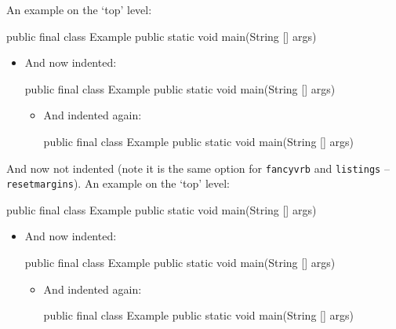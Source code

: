 \documentclass[polish]{article}
\begin{document}
\noindent%
An example on the `top' level:

\begin{javablock}
public final class Example {
	public static void main(String [] args) {
	}
}
\end{javablock}

\begin{itemize}
	\item And now indented:
\begin{javablock}
public final class Example {
	public static void main(String [] args) {
	}
}
\end{javablock}

	\begin{itemize}
		\item And indented again:
\begin{javablock}
public final class Example {
	public static void main(String [] args) {
	}
}
\end{javablock}
	\end{itemize}
\end{itemize}

\bigskip\noindent%
And now not indented (note it is the same option for \texttt{fancyvrb} and \texttt{listings} -- \texttt{resetmargins}).
An example on the `top' level:

\begin{ljavablock}
public final class Example {
	public static void main(String [] args) {
	}
}
\end{ljavablock}

\begin{itemize}
	\item And now indented:
\begin{ljavablock}
public final class Example {
	public static void main(String [] args) {
	}
}
\end{ljavablock}

	\begin{itemize}
		\item And indented again:
\begin{ljavablock}
public final class Example {
	public static void main(String [] args) {
	}
}
\end{ljavablock}
	\end{itemize}
\end{itemize}
\end{document}
